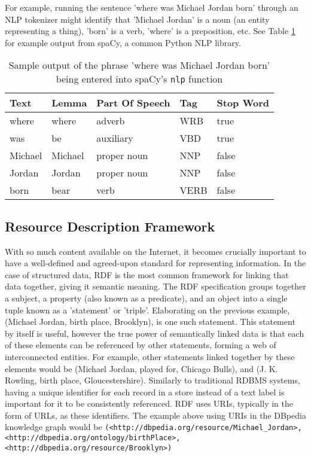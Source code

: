 \documentclass[sigplan,screen]{acmart}
\begin{document}
For example, running the sentence 'where was Michael Jordan born' through an NLP tokenizer might identify that 'Michael Jordan' is a noun (an entity representing a thing), 'born' is a verb, 'where' is a preposition, etc. See Table \ref{table:tokenization} for example output from spaCy, a common Python NLP library.

\begin{table}[]
\caption{Sample output of the phrase 'where was Michael Jordan born' being entered into spaCy's \texttt{nlp} function}
\label{table:tokenization}
\begin{tabular}{|l|l|l|l|l|}
\hline
Text    & Lemma   & Part Of Speech & Tag  & Stop Word \\ \hline
where   & where   & adverb         & WRB  & true      \\ \hline
was     & be      & auxiliary      & VBD  & true      \\ \hline
Michael & Michael & proper noun    & NNP  & false     \\ \hline
Jordan  & Jordan  & proper noun    & NNP  & false     \\ \hline
born    & bear    & verb           & VERB & false     \\ \hline
\end{tabular}
\end{table}

\subsection{Resource Description Framework}

With so much content available on the Internet, it becomes crucially important to have a well-defined and agreed-upon standard for representing information. In the case of structured data, RDF is the most common framework for linking that data together, giving it semantic meaning. The RDF specification groups together a subject, a property (also known as a predicate), and an object into a single tuple known as a 'statement' or 'triple'. Elaborating on the previous example, (Michael Jordan, birth place, Brooklyn), is one such statement. This statement by itself is useful, however the true power of semantically linked data is that each of these elements can be referenced by other statements, forming a web of interconnected entities. For example, other statements linked together by these elements would be (Michael Jordan, played for, Chicago Bulls), and (J. K. Rowling, birth place, Gloucestershire). Similarly to traditional RDBMS systems, having a unique identifier for each record in a store instead of a text label is important for it to be consistently referenced. RDF uses URIs, typically in the form of URLs, as these identifiers. The example above using URIs in the DBpedia knowledge graph would be \texttt{(<http://dbpedia.org/resource/Michael\_Jordan>, <http://dbpedia.org/ontology/birthPlace>, \linebreak  <http://dbpedia.org/resource/Brooklyn>)}
\end{document}
